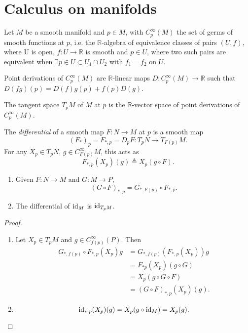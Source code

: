 \section{Calculus on manifolds}
Let $M$ be a smooth manifold and $p \in M$, with
$C_p^\infty(M)$ the set of germs of smooth functions at $p$, i.e. the
$\mathbb{R}$-algebra of equivalence classes of pairs $(U, f)$, where
U is open, $f: U \to \mathbb{R}$ is smooth and $p \in U$, where two
such pairs are equivalent when
$\exists p \in U \subset U_1 \cap U_2$ with $f_1 = f_2$ on $U$.

Point derivations of $C_p^\infty(M)$ are $\mathbb{R}$-linear maps
$D: C_p^\infty(M) \to \mathbb{R}$ such that
$D(fg)(p) = D(f) g(p) + f(p) D(g)$.

The tangent space $T_pM$ of $M$ at $p$ is the $\mathbb{R}$-vector space of
point derivations of $C_p^\infty(M)$.

\begin{defn}[Differential]
The \emph{differential} of a smooth map $F: N \to M$ at $p$ is a
smooth map
$$
(F_\ast)_p = F_{\ast,p} = D_p F : T_p N \to T_{F(p)} M.
$$
For any $X_p \in T_pN$, $g \in C_{F(p)}^\infty M$, this acts as
$$
F_{\ast,p}(X_p)(g) \triangleq X_p(g \circ F).
$$
\end{defn}

\begin{prop}
  \begin{enumerate}
    \item{
      Given $F: N \to M$ and $G: M \to P$,
      $$
        (G \circ F)_{\ast, p}
      = G_{\ast, F(p)} \circ F_{\ast, p}.
      $$
    }
    \item{
      The differential of $\mathrm{id}_M$ is $\mathrm{id}_{T_pM}$.
    }
  \end{enumerate}
\end{prop}
\begin{proof}
  \begin{enumerate}
    \item{
      Let $X_p \in T_pM$ and $g \in C_{f(p)}^\infty(P)$. Then
      \begin{align*}
         G_{\ast, f(p)} \circ F_{\ast, p} (X_p) g
      &= G_{\ast, f(p)} (F_{\ast, p} (X_p)) g \\
      &= F_{\ast p}(X_p) (g \circ G) \\
      &= X_p(g \circ G \circ F) \\
      &= (G \circ F)_{\ast, p}(X_p)(g).
      \end{align*}
    }
    \item{
      $$
        \mathrm{id}_{\ast,p}(X_p)(g)
      = X_p(g \circ \mathrm{id}_M)
      = X_p(g).
      $$
    }
  \end{enumerate}
\end{proof}

